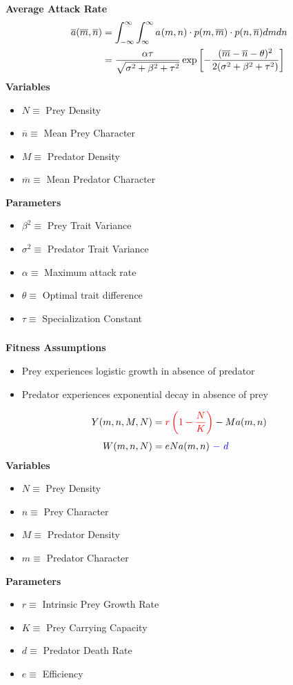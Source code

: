 \documentclass[10pt]{beamer}
\begin{document}
\begin{frame}
	\frametitle{}
	{\bf Average Attack Rate}
	\begin{align*}
		\overline{a}(\overline{m}, \overline{n}) &= \int_{-\infty}^{\infty}\int_{\-\infty}^{\infty} a_{}(m, n) \cdot p(m, \overline{m}) \cdot p(n, \overline{n}) dm dn \\
		&= \frac{\alpha\tau}{\sqrt{\sigma^2 + \beta^2 + \tau^2}}\exp\left[{-\frac{(\overline{m} - \overline{n} - \theta)^2}{2(\sigma^2 + \beta^2 + \tau^2)}}\right]
	\end{align*}
	{\bf Variables}
	\begin{itemize}
		\item $N \equiv $ Prey Density
		\item $\overline{n} \equiv $ Mean Prey Character
		\item $M \equiv $ Predator Density
		\item $\overline{m} \equiv $ Mean Predator Character
	\end{itemize}
	{\bf Parameters}
	\begin{itemize}
		\item $\beta^2 \equiv $ Prey Trait Variance
		\item $\sigma^2 \equiv $ Predator Trait Variance
		\item $\alpha \equiv $ Maximum attack rate
		\item $\theta \equiv $ Optimal trait difference
		\item $\tau \equiv $ Specialization Constant
	\end{itemize}
\end{frame}
\begin{frame}
	\frametitle{}
	{\bf Fitness Assumptions}
	\begin{itemize}
		\item Prey experiences {\color{red}logistic growth} in absence of predator
		\item Predator experiences {\color{blue} exponential decay} in absence of prey
	\end{itemize}
	\begin{align*}
		Y(m, n, M, N) &= {\color{red}r\left(1 - \frac{N}{K}\right)} - Ma(m, n) \\[.1cm]
		W(m, n, N) &= eNa(m, n)\ {\color{blue} -\ d}
	\end{align*}
	{\bf Variables}
	\begin{itemize}
		\item $N \equiv $ Prey Density
		\item $n \equiv $ Prey Character
		\item $M \equiv $ Predator Density
		\item $m \equiv $ Predator Character
	\end{itemize}
	{\bf Parameters}
	\begin{itemize}
		\item $r \equiv $ Intrinsic Prey Growth Rate
		\item $K \equiv $ Prey Carrying Capacity
		\item $d \equiv $ Predator Death Rate
		\item $e \equiv $ Efficiency
	\end{itemize}
\end{frame}
\end{document}
